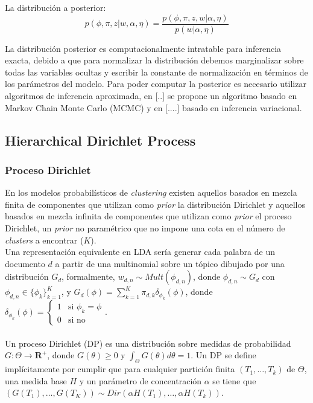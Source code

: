 \documentclass[letterpaper,12pt,oneside]{book} %
\begin{document}
La distribución a posterior:
\begin{equation}
    p(\phi, \pi, z|w, \alpha, \eta) = \frac{p(\phi, \pi, z, w|\alpha, \eta)}{p(w|\alpha, \eta)}
\end{equation}

La distribución posterior es computacionalmente intratable para inferencia exacta, debido a que para normalizar la distribución debemos marginalizar sobre todas las variables ocultas y escribir la constante de normalización en términos de los parámetros del modelo. Para poder computar la posterior es necesario utilizar algoritmos de inferencia aproximada, en [..] se propone un algoritmo basado en Markov Chain Monte Carlo (MCMC) y en [....] basado en inferencia variacional.


\subsection{Hierarchical Dirichlet Process}
\subsubsection{Proceso Dirichlet}

En los modelos probabilísticos de \textit{clustering} existen aquellos basados en mezcla finita de componentes que utilizan como \textit{prior} la distribución Dirichlet y aquellos basados en mezcla infinita de componentes que utilizan como \textit{prior} el proceso Dirichlet, un \textit{prior} no paramétrico que no impone una cota en el número de \textit{clusters} a encontrar ($K$).\\

Una representación equivalente en LDA sería generar cada palabra de un documento $d$ a partir de una multinomial sobre un tópico dibujado por una distribución $G_{d}$, formalmente, $w_{d,n}\sim Mult(\phi_{d,n})$, donde $\phi_{d,n} \sim G_{d}$ con $\phi_{d,n} \in \{\phi_{k}\}_{k=1}^{K}$, y $G_{d}(\phi)=\sum_{k=1}^{K}\pi_{d, k}\delta_{\phi_{k}}(\phi)$, donde $\delta_{\phi_{k}}(\phi) = \begin{cases}
    1 & \text{si $\phi_{k}=\phi$}  \\
    0 & \text{si no}
  \end{cases}$.\\\\

Un proceso Dirichlet (DP) es una distribución sobre medidas de probabilidad $G: \Theta \rightarrow \mathbf{R}^{+}$, donde $G(\theta)\geq 0$ y $\int_{\Theta}G(\theta)d\theta=1$. Un DP se define implícitamente por cumplir que para cualquier partición finita $(T_{1}, \ldots, T_{k})$ de $\Theta$, una medida base $H$ y un parámetro de concentración $\alpha$ se  tiene que $(G(T_{1}), \ldots, G(T_{K})) \sim Dir(\alpha H(T_{1}), \ldots, \alpha H(T_{k}))$.
\end{document}
